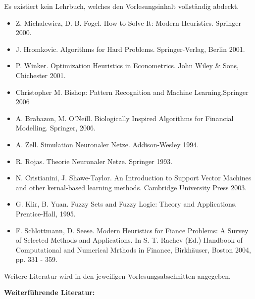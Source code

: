 \begin{course}
\begin{media}
\end{media}

\begin{literature}Es existiert kein Lehrbuch, welches den Vorlesungsinhalt vollständig abdeckt.

 \begin{itemize}\item Z. Michalewicz, D. B. Fogel. How to Solve It: Modern Heuristics. Springer 2000.  \item J. Hromkovic. Algorithms for Hard Problems. Springer-Verlag, Berlin 2001.  \item P. Winker. Optimization Heuristics in Econometrics. John Wiley \& Sons, Chichester 2001.  \item Christopher M. Bishop: Pattern Recognition and Machine Learning,Springer 2006  \item A. Brabazon, M. O’Neill. Biologically Inspired Algorithms for Financial Modelling. Springer, 2006.  \item A. Zell. Simulation Neuronaler Netze. Addison-Wesley 1994.  \item R. Rojas. Theorie Neuronaler Netze. Springer 1993.  \item N. Cristianini, J. Shawe-Taylor. An Introduction to Support Vector Machines and other kernal-based learning methods. Cambridge University Press 2003.  \item G. Klir, B. Yuan. Fuzzy Sets and Fuzzy Logic: Theory and Applications. Prentice-Hall, 1995.  \item F. Schlottmann, D. Seese. Modern Heuristics for Fiance Problems: A Survey of Selected Methods and Applications. In S. T. Rachev (Ed.) Handbook of Computational and Numerical Mrthods in Finance, Birkhäuser, Boston 2004, pp. 331 - 359.  \end{itemize}

Weitere Literatur wird in den jeweiligen Vorlesungsabschnitten angegeben.

 

\textbf{Weiterführende Literatur:}


\end{literature}
\end{course}
